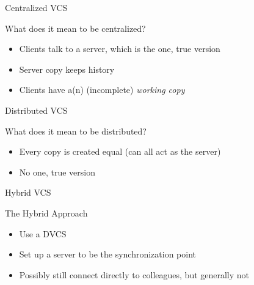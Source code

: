 \documentclass[table,dvipsnames]{beamer}
\begin{document}
\begin{frame}{Centralized VCS}
	\begin{block}{What does it mean to be centralized?}
		\begin{itemize}
			\item Clients talk to a server, which is the one, true version
			\item Server copy keeps history
			\item Clients have a(n) (incomplete) \emph{working copy}
		\end{itemize}
	\end{block}
\end{frame}


\begin{frame}{Distributed VCS}
	\begin{block}{What does it mean to be distributed?}
		\begin{itemize}
			\item Every copy is created equal (can all act as the server)
			\item No one, true version
		\end{itemize}
	\end{block}
\end{frame}


\begin{frame}{Hybrid VCS}
	\begin{block}{The Hybrid Approach}
		\begin{itemize}
			\item Use a DVCS
			\item Set up a server to be the synchronization point
			\item Possibly still connect directly to colleagues, but generally
				not
		\end{itemize}
	\end{block}
\end{frame}

\end{document}
